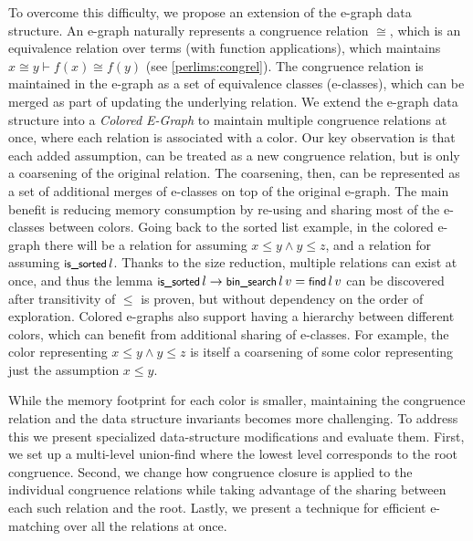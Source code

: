 To overcome this difficulty, we propose an extension of the e-graph data structure.
An e-graph naturally represents a congruence relation $\cong$, which is an equivalence relation over terms (with function applications), which  maintains $x \cong y \vdash f(x) \cong f(y)$ (see \autoref{perlims:congrel}).
The congruence relation is maintained in the e-graph as a set of equivalence classes (e-classes), which can be merged as part of updating the underlying relation. 
We extend the e-graph data structure into a \emph{Colored E-Graph} to maintain multiple congruence relations at once, where each relation is associated with a color.
Our key observation is that each added assumption, can be treated as a new congruence relation, but is only a coarsening of the original relation. 
The coarsening, then, can be represented as a set of additional merges of e-classes on top of the original e-graph.
The main benefit is reducing memory consumption by re-using and sharing most of the e-classes between colors.
Going back to the sorted list example, in the colored e-graph there will be a \cred relation for assuming $x \le y \land y \le z$, and a \cblue relation for assuming $\tissorted\,l$.
Thanks to the size reduction, multiple relations can exist at once, and thus the lemma $\tissorted\,l \rightarrow \tbinsearch\, l\,v = \tlfind\,l\,v$ can be discovered after transitivity of $\leq$ is proven, but without dependency on the order of exploration.
Colored e-graphs also support having a hierarchy between different colors, which can benefit from additional sharing of e-classes.
For example, the \cred color representing $x \le y \land y \le z$ is itself a coarsening of some \cgreen color representing just the assumption $x \le y$.

While the memory footprint for each color is smaller, maintaining the congruence relation and the data structure invariants becomes more challenging.
To address this we present specialized data-structure modifications and evaluate them.
First, we set up a multi-level union-find where the lowest level corresponds to the root congruence.
Second, we change how congruence closure is applied to the individual congruence relations while taking advantage of the sharing between each such relation and the root. 
Lastly, we present a technique for efficient e-matching over all the relations at once.

